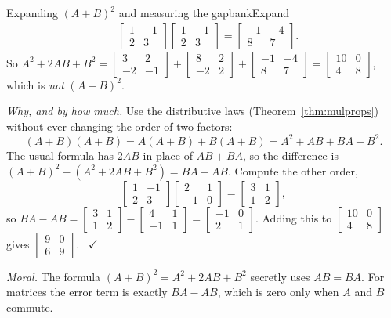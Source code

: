 \documentclass[11pt]{article}
\begin{document}
\begin{exmp}{Expanding $(A+B)^2$ and measuring the gap}{bankExpand}
\begin{align*}
&\begin{bmatrix}1&-1\\2&3\end{bmatrix}\begin{bmatrix}1&-1\\2&3\end{bmatrix}=\begin{bmatrix}-1&-4\\8&7\end{bmatrix}.
\end{align*}
So $A^2+2AB+B^2=\begin{bmatrix}3&2\\-2&-1\end{bmatrix}+\begin{bmatrix}8&2\\-2&2\end{bmatrix}+\begin{bmatrix}-1&-4\\8&7\end{bmatrix}=\begin{bmatrix}10&0\\4&8\end{bmatrix}$, which is \emph{not} $(A+B)^2$.

\emph{Why, and by how much.} Use the distributive laws (Theorem~\ref{thm:mulprops}) without ever changing the order of two factors:
\[
(A+B)(A+B)=A(A+B)+B(A+B)=A^2+AB+BA+B^2.
\]
The usual formula has $2AB$ in place of $AB+BA$, so the difference is $(A+B)^2-(A^2+2AB+B^2)=BA-AB$. Compute the other order,
\[
\begin{bmatrix}1&-1\\2&3\end{bmatrix}\begin{bmatrix}2&1\\-1&0\end{bmatrix}=\begin{bmatrix}3&1\\1&2\end{bmatrix},
\]
so $BA-AB=\begin{bmatrix}3&1\\1&2\end{bmatrix}-\begin{bmatrix}4&1\\-1&1\end{bmatrix}=\begin{bmatrix}-1&0\\2&1\end{bmatrix}$. Adding this to $\begin{bmatrix}10&0\\4&8\end{bmatrix}$ gives $\begin{bmatrix}9&0\\6&9\end{bmatrix}$. \ $\checkmark$

\emph{Moral.} The formula $(A+B)^2=A^2+2AB+B^2$ secretly uses $AB=BA$. For matrices the error term is exactly $BA-AB$, which is zero only when $A$ and $B$ commute.
\end{exmp}
\end{document}
